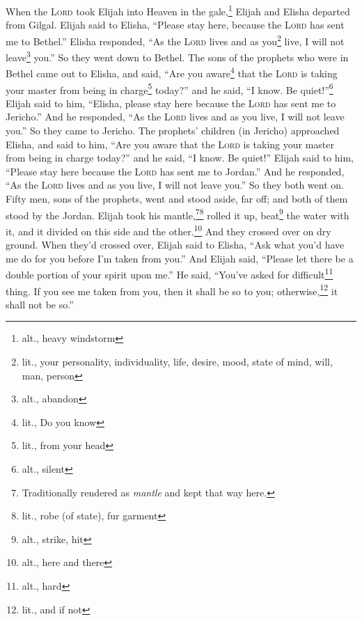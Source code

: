 
\begin{inparaenum}
     When the \textsc{Lord} took Elijah into Heaven in the gale,\footnote{alt., heavy windstorm} Elijah and Elisha departed from Gilgal.%
     Elijah said to Elisha, ``Please stay here, because the \textsc{Lord} has sent me to Bethel.'' Elisha responded, ``As the \textsc{Lord} lives and as you\footnote{lit., your personality, individuality, life, desire, mood, state of mind, will, man, person} live, I will not leave\footnote{alt., abandon} you.'' So they went down to Bethel.%
     The sons of the prophets who were in Bethel came out to Elisha, and said, ``Are you aware\footnote{lit., Do you know} that the \textsc{Lord} is taking your master from being in charge\footnote{lit., from your head} today?'' and he said, ``I know. Be quiet!''\footnote{alt., silent}%
     Elijah said to him, ``Elisha, please stay here because the \textsc{Lord} has sent me to Jericho.'' And he responded, ``As the \textsc{Lord} lives and as you live, I will not leave you.'' So they came to Jericho.%
     The prophets' children (in Jericho) approached Elisha, and said to him, ``Are you aware that the \textsc{Lord} is taking your master from being in charge today?'' and he said, ``I know. Be quiet!''%
     Elijah said to him, ``Please stay here because the \textsc{Lord} has sent me to Jordan.'' And he responded, ``As the \textsc{Lord} lives and as you live, I will not leave you.'' So they both went on.%
     Fifty men, sons of the prophets, went and stood aside, far off; and both of them stood by the Jordan.%
     Elijah took his mantle,\footnote{Traditionally rendered as \textit{mantle} and kept that way here.}\footnote{lit., robe (of state), fur garment} rolled it up, beat\footnote{alt., strike, hit} the water with it, and it divided on this side and the other.\footnote{alt., here and there} And they crossed over on dry ground.%
     When they'd crossed over, Elijah said to Elisha, ``Ask what you'd have me do for you before I'm taken from you.'' And Elijah said, ``Please let there be a double portion of your spirit upon me.''%
     He said, ``You've asked for difficult\footnote{alt., hard} thing. If you see me taken from you, then it shall be so to you; otherwise,\footnote{lit., and if not} it shall not be so.''%

\end{inparaenum}
